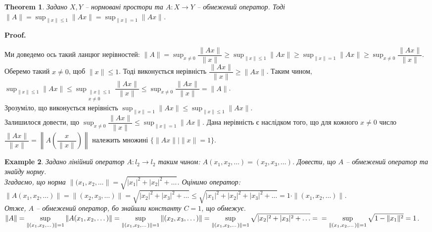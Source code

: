 \documentclass[a4paper, 10pt]{article}
\makeatletter
\theoremstyle{theoremdd}
\newtheorem{theorem}{Theorem}[subsection]
\theoremstyle{theoremdd}
\theoremstyle{theoremdd}
\theoremstyle{theoremdd}
\newtheorem{example}[theorem]{Example}
\theoremstyle{theoremdd}
\theoremstyle{theoremdd}
\theoremstyle{theoremdd}
\theoremstyle{theoremdd}
\renewenvironment{proof}[1][Proof.\\]{\par
\pushQED{\hfill \qed}%
\normalfont \topsep6\p@\@plus6\p@\relax
\trivlist
\item\relax
{\bfseries
#1\@addpunct{.}}\hspace\labelsep\ignorespaces
}{%
\popQED\endtrivlist\@endpefalse
}
\makeatother
\begin{document}
\begin{theorem}
Задано $X,Y$ -- нормовані простори та $A \colon X \to Y$ -- обмежений оператор. Тоді $\displaystyle\|A\| = \sup_{\|x\| \leq 1} \|Ax\| = \sup_{\|x\| = 1} \|Ax\|$.
\end{theorem}

\begin{proof}
Ми доведемо ось такий ланцюг нерівностей: $\|A\| = \displaystyle\sup_{x \neq 0} \dfrac{\|Ax\|}{\|x\|} \geq \sup_{\|x\|\leq 1} \|Ax\| \geq \sup_{\|x\| = 1} \|Ax\| \geq \sup_{x \neq 0} \dfrac{\|Ax\|}{\|x\|}$.\\
Оберемо такий $x \neq 0$, щоб $\|x\| \leq 1$. Тоді виконується нерівність $\dfrac{\|Ax\|}{\|x\|} \geq \|A x\|$. Таким чином, $\displaystyle\sup_{\|x\| \leq 1} \|Ax\| \leq \sup_{\substack{\|x\| \leq 1 \\ x \neq 0 }} \dfrac{\|Ax\|}{\|x\|} \leq \sup_{x \neq 0} \dfrac{\|Ax\|}{\|x\|} = \|A\|$.\\
Зрозуміло, що виконується нерівність $\displaystyle\sup_{\|x\| = 1} \|Ax\| \leq \sup_{\|x\| \leq 1} \|Ax\|$.\\
Залишилося довести, що $\displaystyle\sup_{x \neq 0} \dfrac{\|Ax\|}{\|x\|} \leq \sup_{\|x\|=  1} \|Ax\|$. Дана нерівність є наслідком того, що для кожного $x \neq 0$ число $\dfrac{\|Ax\|}{\|x\|} = \left\| A \left( \dfrac{x}{\|x\|} \right) \right\|$ належить множині $\{ \|Ax\| \mid \|x\| = 1\}$.
\end{proof}

\begin{example}
Задано лінійний оператор $A \colon l_2 \to l_2$ таким чином: $A(x_1,x_2,\dots) = (x_2,x_3,\dots)$. Довести, що $A$ -- обмежений оператор та знайду норму.\\
Згадаємо, що норма $\|(x_1,x_2,\dots\| = \sqrt{|x_1|^2 + |x_2|^2 + \dots}$. Оцінимо оператор:\\
$\|A (x_1,x_2,\dots)\| = \|(x_2,x_3,\dots)\| = \sqrt{|x_2|^2 + |x_3|^2 + \dots} \leq \sqrt{|x_1|^2 + |x_2|^2 + |x_3|^2 + \dots} = 1 \cdot \|(x_1,x_2,\dots)\|$.\\
Отже, $A$ -- обмежений оператор, бо знайшли константу $C = 1$, що обмежує.\\
$\|A\| = \displaystyle\sup_{\|(x_1,x_2,\dots)\| = 1} \|A(x_1,x_2,\dots)\| = \displaystyle\sup_{\|(x_1,x_2,\dots)\| = 1} \|(x_2,x_3,\dots)\| = \sup_{\|(x_1,x_2,\dots)\| = 1} \sqrt{|x_2|^2 + |x_3|^2 + \dots} = \\
= \sup_{\|(x_1,x_2,\dots)\| = 1} \sqrt{1 - \|x_1\|^2} = 1$.
\end{example}
\end{document}
